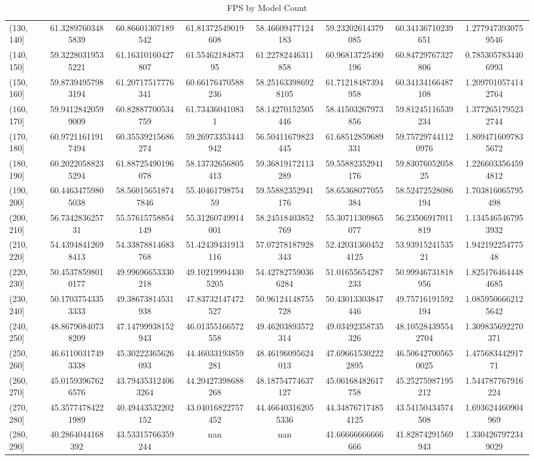 \begin{table}[H]
\begin{tabular}{|l |c |c |c |c |c |c |c|}
(130, 140] & 61.32897603485839 & 60.86601307189542 & 61.81372549019608 & 58.46609477124183 & 59.23202614379085 & 60.34136710239651 & 1.2779473930759546 \\
(140, 150] & 59.32280319535221 & 61.16310160427807 & 61.5546218487395 & 61.22782446311858 & 60.96813725490196 & 60.84729767327806 & 0.7853057834406993 \\
(150, 160] & 59.87394957983194 & 61.20717517776341 & 60.66176470588236 & 58.251633986928105 & 61.71218487394958 & 60.34134166487108 & 1.2097010574142764 \\
(160, 170] & 59.94128420599009 & 60.82887700534759 & 61.734360410831 & 58.14270152505446 & 58.41503267973856 & 59.81245116539234 & 1.3772651795232744 \\
(170, 180] & 60.97211611917494 & 60.35539215686274 & 59.26973353443942 & 56.50411679823445 & 61.68512859689331 & 59.757297441120976 & 1.8094716097835672 \\
(180, 190] & 60.20220588235294 & 61.88725490196078 & 58.13732656805413 & 59.36819172113289 & 59.55882352941176 & 59.8307605205825 & 1.2266033564594812 \\
(190, 200] & 60.44634759805038 & 58.560156518747846 & 55.4046179875459 & 59.55882352941176 & 58.65368077055384 & 58.52472528086194 & 1.703816065795498 \\
(200, 210] & 56.734283625731 & 55.57615758854149 & 55.31260749914001 & 58.24518403852769 & 55.30711309865077 & 56.23506917011819 & 1.1345465467953932 \\
(210, 220] & 54.43948412698413 & 54.33878814683768 & 51.42439431913116 & 57.07278187928343 & 52.420313604524125 & 53.9391524153521 & 1.94219225477548 \\
(220, 230] & 50.45378598010177 & 49.99696653330218 & 49.102199944305205 & 54.427827590366284 & 51.01655654287233 & 50.99946731818956 & 1.8251764644484685 \\
(230, 240] & 50.17037543353333 & 49.38673814531938 & 47.83732147472527 & 50.96124148755728 & 50.43013303847446 & 49.75716191592194 & 1.0859506662125642 \\
(240, 250] & 48.86790840738209 & 47.14799938152943 & 46.01355166572558 & 49.46203893572314 & 49.03492358735326 & 48.105284395542704 & 1.309835692270371 \\
(250, 260] & 46.61100317493338 & 45.30222365626093 & 44.46033193859281 & 48.46196095624013 & 47.696615302222895 & 46.506427005650025 & 1.47568344291771 \\
(260, 270] & 45.01593967626576 & 43.794353124063264 & 44.20427398688268 & 48.18754774637127 & 45.06168482617758 & 45.25275987195212 & 1.544787767916224 \\
(270, 280] & 45.35774784221989 & 40.49443532202152 & 43.04016822757452 & 44.466403162055336 & 44.348767174854125 & 43.54150434574508 & 1.693624460904969 \\
(280, 290] & 40.2864044168392 & 43.53315766359244 & nan & nan & 41.66666666666666 & 41.82874291569943 & 1.3304267972349029 \\
\hline
\end{tabular}
\caption{FPS by Model Count}
\label{tab:fps_model_count}
\end{table}


